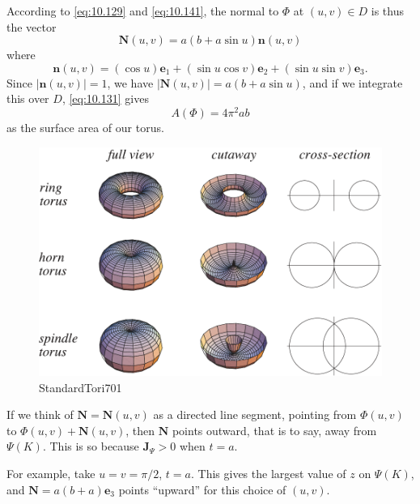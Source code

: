 \begin{newexample}
    According to \eqref{eq:10.129} and \eqref{eq:10.141}, 
    the normal to $\Phi$ at $(u, v) \in D$ is thus the vector
    \begin{equation*}
        \mathbf{N}(u,v) = a(b+a\sin u) \mathbf{n}(u,v)
    \end{equation*}
    where 
    \begin{equation*}
        \mathbf{n}(u,v) = 
        (\cos u) \mathbf{e}_1 + 
        (\sin u \cos v) \mathbf{e}_2 + 
        (\sin u \sin v) \mathbf{e}_3 . 
    \end{equation*}
    Since $|\mathbf{n}(u, v)| = 1$, 
    we have $|\mathbf{N}(u, v)| = a(b + a \sin u)$, 
    and if we integrate this over $D$, \eqref{eq:10.131} gives
    \begin{equation*}
        A(\Phi) = 4\pi^2 ab
    \end{equation*}
    as the surface area of our torus.
    \begin{figure}[htbp]
        \centering
        \includegraphics[width=0.7\linewidth]{pic/StandardTori701.pdf}
        \caption{StandardTori701}
        \label{fig:StandardTori701}
    \end{figure}
    If we think of $\mathbf{N} = \mathbf{N}(u, v)$ as a directed line segment, 
    pointing from $\Phi(u, v)$ to $\Phi(u, v) + \mathbf{N}(u, v)$, 
    then $\mathbf{N}$ points outward, 
    that is to say, away from $\Psi(K)$. 
    This is so because $\mathbf{J}_{\Psi} > 0$ when $t = a$.

    For example, take $u = v = \pi/2$, $t = a$. 
    This gives the largest value of $z$ on $\Psi(K)$, 
    and $\mathbf{N} = a(b + a)\mathbf{e}_3$ points ``upward'' for this choice of $(u, v)$.
\end{newexample}

